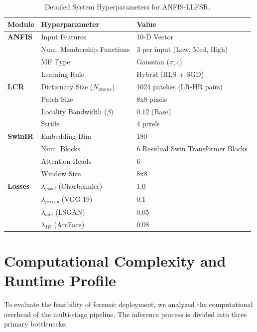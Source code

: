 \begin{table}[htbp]
    \centering
    \caption{Detailed System Hyperparameters for ANFIS-LLFSR.}
    \label{tab:hyperparams_detailed}
    \begin{tabular}{lll}
        \toprule
        \textbf{Module} & \textbf{Hyperparameter} & \textbf{Value} \\
        \midrule
        \textbf{ANFIS} & Input Features & 10-D Vector \\
                       & Num. Membership Functions & 3 per input (Low, Med, High) \\
                       & MF Type & Gaussian ($\sigma, c$) \\
                       & Learning Rule & Hybrid (RLS + SGD) \\
        \midrule
        \textbf{LCR}   & Dictionary Size ($N_{atoms}$) & 1024 patches (LR-HR pairs) \\
                       & Patch Size & 8x8 pixels \\
                       & Locality Bandwidth ($\beta$) & 0.12 (Base) \\
                       & Stride & 4 pixels \\
        \midrule
        \textbf{SwinIR} & Embedding Dim & 180 \\
                       & Num. Blocks & 6 Residual Swin Transformer Blocks \\
                       & Attention Heads & 6 \\
                       & Window Size & 8x8 \\
        \midrule
        \textbf{Losses} & $\lambda_{pixel}$ (Charbonnier) & 1.0 \\
                       & $\lambda_{percep}$ (VGG-19) & 0.1 \\
                       & $\lambda_{adv}$ (LSGAN) & 0.05 \\
                       & $\lambda_{ID}$ (ArcFace) & 0.08 \\
        \bottomrule
    \end{tabular}
\end{table}

\section{Computational Complexity and Runtime Profile}
To evaluate the feasibility of forensic deployment, we analyzed the computational overhead of the multi-stage pipeline. The inference process is divided into three primary bottlenecks:

